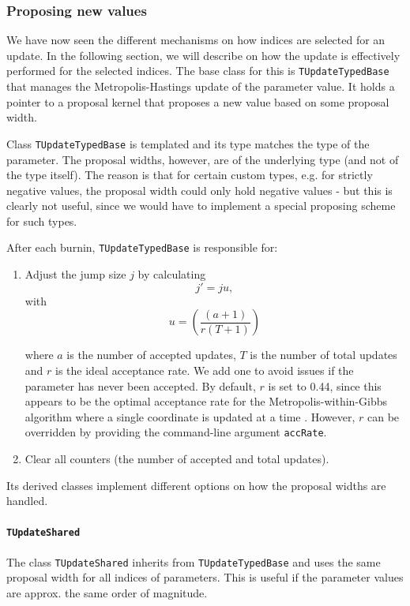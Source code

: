 \documentclass[a4paper,11pt]{article}
\newcommand{\class}[1]{\texttt{#1}}
\begin{document}
\subsubsection{Proposing new values}
We have now seen the different mechanisms on how indices are selected for an update. In the following section, we will describe on how the update is effectively performed for the selected indices. The base class for this is \class{TUpdateTypedBase} that manages the Metropolis-Hastings update of the parameter value. It holds a pointer to a proposal kernel that proposes a new value based on some proposal width.

Class \class{TUpdateTypedBase} is templated and its type matches the type of the parameter. The proposal widths, however, are of the underlying type (and not of the type itself). The reason is that for certain custom types, e.g. for strictly negative values, the proposal width could only hold negative values - but this is clearly not useful, since we would have to implement a special proposing scheme for such types.

After each burnin, \class{TUpdateTypedBase} is responsible for:
\begin{enumerate}
 \item Adjust the jump size $j$ by calculating
 \begin{equation*}
  j' = ju,
 \end{equation*}
 with
 \begin{equation}\label{eq:scalePropWidth}
  u = \left(\frac{(a+1)}{r(T+1)} \right)
 \end{equation}

 where $a$ is the number of accepted updates, $T$ is the number of total updates and $r$ is the ideal acceptance rate. We add one to avoid issues if the parameter has never been accepted. By default, $r$ is set to 0.44, since this appears to be the optimal acceptance rate for the Metropolis-within-Gibbs algorithm where a single coordinate is updated at a time \citep{brooks2011}. However, $r$ can be overridden by providing the command-line argument \texttt{accRate}.

 \item Clear all counters (the number of accepted and total updates).
\end{enumerate}

Its derived classes implement different options on how the proposal widths are handled.

\paragraph{\class{TUpdateShared}}
The class \class{TUpdateShared} inherits from \class{TUpdateTypedBase} and uses the same proposal width for all indices of parameters. This is useful if the parameter values are approx. the same order of magnitude.
\end{document}
